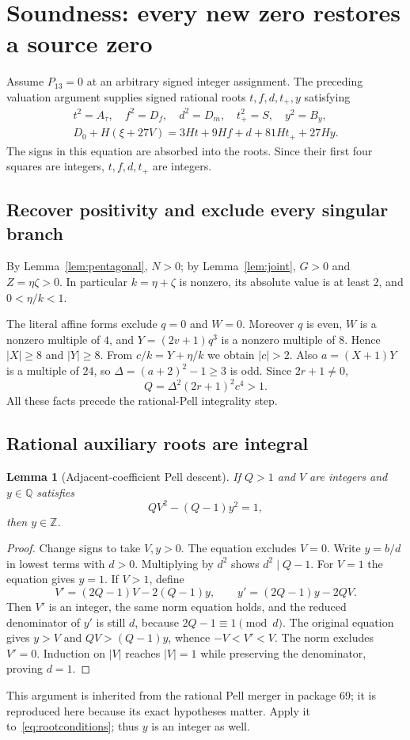 \documentclass[11pt]{article}
\newtheorem{lemma}[theorem]{Lemma}
\theoremstyle{remark}\newtheorem{remark}[theorem]{Remark}
\newcommand{\Z}{\mathbb Z}\newcommand{\Q}{\mathbb Q}\newcommand{\N}{\mathbb N}
\begin{document}
\section{Soundness: every new zero restores a source zero}\label{sec:soundness}
Assume $P_{13}=0$ at an arbitrary signed integer assignment. The preceding
valuation argument supplies signed rational roots $t,f,d,t_+,y$ satisfying
\begin{gather}
 t^2=A_\tau,\quad f^2=D_f,\quad d^2=D_m,\quad t_+^2=S,
 \quad y^2=B_y,\label{eq:rootconditions}\\
 D_0+H(\xi+27V)=3Ht+9Hf+d+81Ht_++27Hy.\label{eq:carriereq}
\end{gather}
The signs in this equation are absorbed into the roots. Since their first
four squares are integers, $t,f,d,t_+$ are integers.

\subsection{Recover positivity and exclude every singular branch}
By Lemma~\ref{lem:pentagonal}, $N>0$; by Lemma~\ref{lem:joint}, $G>0$
and $Z=\eta\zeta>0$. In particular $k=\eta+\zeta$ is nonzero, its
absolute value is at least $2$, and $0<\eta/k<1$.

The literal affine forms exclude $q=0$ and $W=0$. Moreover $q$ is even,
$W$ is a nonzero multiple of $4$, and $Y=(2v+1)q^3$ is a nonzero
multiple of $8$. Hence $|X|\ge8$ and $|Y|\ge8$. From
$c/k=Y+\eta/k$ we obtain $|c|>2$. Also $a=(X+1)Y$ is a multiple of
$24$, so $\Delta=(a+2)^2-1\ge3$ is odd. Since $2r+1\ne0$,
\[
 Q=\Delta^2(2r+1)^2c^4>1.
\]
All these facts precede the rational-Pell integrality step.

\subsection{Rational auxiliary roots are integral}\label{sec:descent}
\begin{lemma}[Adjacent-coefficient Pell descent]\label{lem:descent}
If $Q>1$ and $V$ are integers and $y\in\Q$ satisfies
\[
 QV^2-(Q-1)y^2=1,
\]
then $y\in\Z$.
\end{lemma}
\begin{proof}
Change signs to take $V,y>0$. The equation excludes $V=0$. Write
$y=b/d$ in lowest terms with $d>0$. Multiplying by $d^2$ shows
$d^2\mid Q-1$. For $V=1$ the equation gives $y=1$.
If $V>1$, define
\[
 V'=(2Q-1)V-2(Q-1)y,\qquad y'=(2Q-1)y-2QV.
\]
Then $V'$ is an integer, the same norm equation holds, and the reduced
denominator of $y'$ is still $d$, because $2Q-1\equiv1\pmod d$.
The original equation gives $y>V$ and $QV>(Q-1)y$, whence
$-V<V'<V$. The norm excludes $V'=0$. Induction on $|V|$ reaches
$|V|=1$ while preserving the denominator, proving $d=1$.
\end{proof}
This argument is inherited from the rational Pell merger in package 69;
it is reproduced here because its exact hypotheses matter.
Apply it to~\eqref{eq:rootconditions}; thus $y$ is an integer as well.
\end{document}
